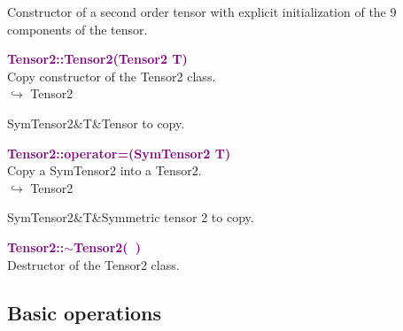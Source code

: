 Constructor of a second order tensor with explicit initialization of the 9 components of the tensor.

\textcolor{purple}{\textbf{Tensor2::Tensor2(Tensor2 T)}}\label{Tensor2::Tensor2(Tensor2 T)}\\
Copy constructor of the Tensor2 class.\\ \hspace*{10mm}$\hookrightarrow$ Tensor2

\begin{tcolorbox}[width=\textwidth,myArgs,tabularx={ll|R}]
SymTensor2&T&Tensor to copy.
\end{tcolorbox}


\textcolor{purple}{\textbf{Tensor2::operator=(SymTensor2 T)}}\label{Tensor2::operator=(SymTensor2 T)}\\
Copy a SymTensor2 into a Tensor2.\\ \hspace*{10mm}$\hookrightarrow$ Tensor2

\begin{tcolorbox}[width=\textwidth,myArgs,tabularx={ll|R}]
SymTensor2&T&Symmetric tensor 2 to copy.
\end{tcolorbox}


\textcolor{purple}{\textbf{Tensor2::$\sim$Tensor2(~)}}\label{Tensor2::~Tensor2()}\\
Destructor of the Tensor2 class.


\subsection{Basic operations}

